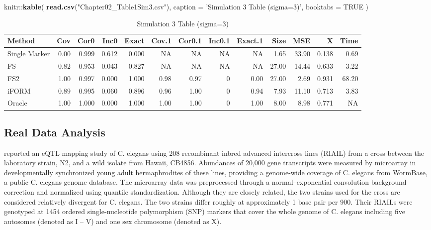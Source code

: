 \documentclass[11pt,]{book}
\newenvironment{Shaded}{\begin{snugshade}}{\end{snugshade}}
\newcommand{\KeywordTok}[1]{\textcolor[rgb]{0.13,0.29,0.53}{\textbf{{#1}}}}
\newcommand{\DataTypeTok}[1]{\textcolor[rgb]{0.13,0.29,0.53}{{#1}}}
\newcommand{\StringTok}[1]{\textcolor[rgb]{0.31,0.60,0.02}{{#1}}}
\newcommand{\OtherTok}[1]{\textcolor[rgb]{0.56,0.35,0.01}{{#1}}}
\newcommand{\NormalTok}[1]{{#1}}
\theoremstyle{definition}
\theoremstyle{definition}
\theoremstyle{remark}
\begin{document}
\begin{Shaded}
\begin{Highlighting}[]
\NormalTok{knitr::}\KeywordTok{kable}\NormalTok{(}
  \KeywordTok{read.csv}\NormalTok{(}\StringTok{"Chapter02_Table1Sim3.csv"}\NormalTok{), }\DataTypeTok{caption =} \StringTok{'Simulation 3 Table (sigma=3)'}\NormalTok{,}
  \DataTypeTok{booktabs =} \OtherTok{TRUE}
\NormalTok{)}
\end{Highlighting}
\end{Shaded}

\begin{table}

\caption{\label{tab:sim3}Simulation 3 Table (sigma=3)}
\centering
\begin{tabular}[t]{lrrrrrrrrrrrr}
\toprule
Method & Cov & Cor0 & Inc0 & Exact & Cov.1 & Cor0.1 & Inc0.1 & Exact.1 & Size & MSE & X & Time\\
\midrule
Single Marker & 0.00 & 0.999 & 0.612 & 0.000 & NA & NA & NA & NA & 1.65 & 33.90 & 0.138 & 0.69\\
FS & 0.82 & 0.953 & 0.043 & 0.827 & NA & NA & NA & NA & 27.00 & 14.44 & 0.633 & 3.22\\
FS2 & 1.00 & 0.997 & 0.000 & 1.000 & 0.98 & 0.97 & 0 & 0.00 & 27.00 & 2.69 & 0.931 & 68.20\\
iFORM & 0.89 & 0.995 & 0.060 & 0.896 & 0.96 & 1.00 & 0 & 0.94 & 7.93 & 11.10 & 0.713 & 3.83\\
Oracle & 1.00 & 1.000 & 0.000 & 1.000 & 1.00 & 1.00 & 0 & 1.00 & 8.00 & 8.98 & 0.771 & NA\\
\bottomrule
\end{tabular}
\end{table}

\subsection{Real Data Analysis}\label{real-data-analysis}

\cite{rockman2010selection} reported an eQTL mapping study of C. elegans
using 208 recombinant inbred advanced intercross lines (RIAIL) from a
cross between the laboratory strain, N2, and a wild isolate from Hawaii,
CB4856. Abundances of 20,000 gene transcripts were measured by
microarray in developmentally synchronized young adult hermaphrodites of
these lines, providing a genome-wide coverage of C. elegans from
WormBase, a public C. elegans genome database. The microarray data was
preprocessed through a normal--exponential convolution background
correction and normalized using quantile standardization. Although they
are closely related, the two strains used for the cross are considered
relatively divergent for C. elegans. The two strains differ roughly at
approximately 1 base pair per 900. Their RIAILs were genotyped at 1454
ordered single-nucleotide polymorphism (SNP) markers that cover the
whole genome of C. elegans including five autosomes (denoted as I -- V)
and one sex chromosome (denoted as X).
\end{document}
